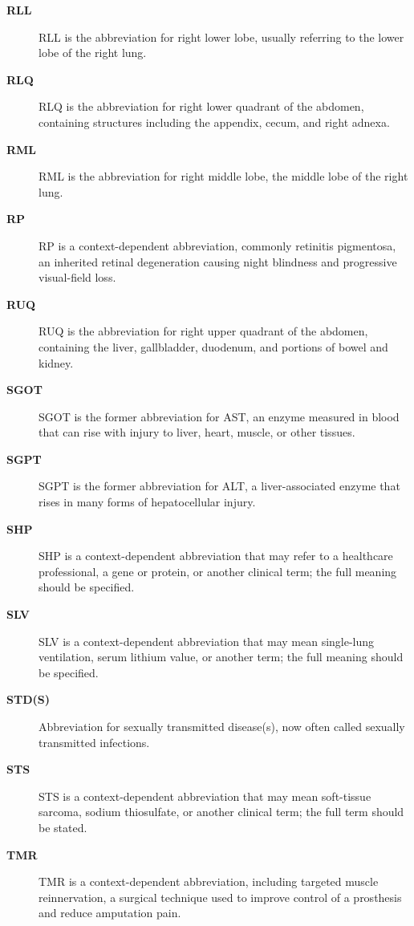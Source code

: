 \begin{description}
\item[\textbf{RLL}] RLL is the abbreviation for right lower lobe, usually referring to the lower lobe of the right lung.

\item[\textbf{RLQ}] RLQ is the abbreviation for right lower quadrant of the abdomen, containing structures including the appendix, cecum, and right adnexa.

\item[\textbf{RML}] RML is the abbreviation for right middle lobe, the middle lobe of the right lung.

\item[\textbf{RP}] RP is a context-dependent abbreviation, commonly retinitis pigmentosa, an inherited retinal degeneration causing night blindness and progressive visual-field loss.

\item[\textbf{RUQ}] RUQ is the abbreviation for right upper quadrant of the abdomen, containing the liver, gallbladder, duodenum, and portions of bowel and kidney.

\item[\textbf{SGOT}] SGOT is the former abbreviation for AST, an enzyme measured in blood that can rise with injury to liver, heart, muscle, or other tissues.

\item[\textbf{SGPT}] SGPT is the former abbreviation for ALT, a liver-associated enzyme that rises in many forms of hepatocellular injury.

\item[\textbf{SHP}] SHP is a context-dependent abbreviation that may refer to a healthcare professional, a gene or protein, or another clinical term; the full meaning should be specified.

\item[\textbf{SLV}] SLV is a context-dependent abbreviation that may mean single-lung ventilation, serum lithium value, or another term; the full meaning should be specified.

\item[\textbf{STD(S)}] Abbreviation for sexually transmitted disease(s), now often called sexually transmitted infections.

\item[\textbf{STS}] STS is a context-dependent abbreviation that may mean soft-tissue sarcoma, sodium thiosulfate, or another clinical term; the full term should be stated.

\item[\textbf{TMR}] TMR is a context-dependent abbreviation, including targeted muscle reinnervation, a surgical technique used to improve control of a prosthesis and reduce amputation pain.


\end{description}
